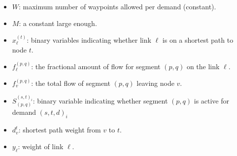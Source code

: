 \documentclass[a4paper,USenglish]{article}
\begin{document}
\begin{itemize}
\item
	$W$: maximum  number of waypoints allowed per demand (constant).
\item
	$M$: a constant large enough.		
\item	
	$x^{(t)}_{\ell}$:	binary variables indicating whether link $\ell$ is on a shortest path to node $t$.
\item	
	$f^{(p,q)}_{\ell}$: the fractional amount of flow for segment $(p,q)$ on the link $\ell$.
\item	
	$f^{(p,q)}_{v}$:  the total flow of segment $(p,q)$ leaving  node $v$.
\item
	$S^{(s,t)_i}_{(p,q)}$: binary variable indicating whether segment $(p,q)$ is  active for demand $(s,t,d)_i$
\item
	$d^{t}_v$: shortest path weight from $v$ to $t$.
\item	
	$y_{\ell}$: weight of link $\ell$.
\end{itemize}
\end{document}
